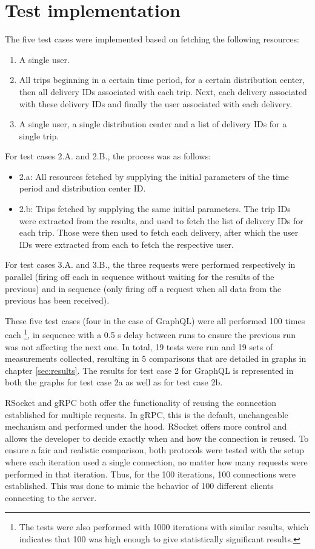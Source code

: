 \section{Test implementation}

The five test cases were implemented based on fetching the following resources:
\begin{enumerate}
    \item A single user.
    \item All trips beginning in a certain time period, for a certain distribution center, then all delivery IDs associated with each trip. Next, each delivery associated with these delivery IDs and finally the user associated with each delivery.
    \item A single user, a single distribution center and a list of delivery IDs for a single trip.
\end{enumerate}
For test cases 2.A. and 2.B., the process was as follows:
\begin{itemize}
    \item 2.a: All resources fetched by supplying the initial parameters of the time period and distribution center ID.
    \item 2.b: Trips fetched by supplying the same initial parameters. The trip IDs were extracted from the results, and used to fetch the list of delivery IDs for each trip. Those were then used to fetch each delivery, after which the user IDs were extracted from each to fetch the respective user.
\end{itemize}
For test cases 3.A. and 3.B., the three requests were performed respectively in parallel (firing off each in sequence without waiting for the results of the previous) and in sequence (only firing off a request when all data from the previous has been received).

These five test cases (four in the case of GraphQL) were all performed 100 times each \footnote{The tests were also performed with 1000 iterations with similar results, which indicates that 100 was high enough to give statistically significant results.}, in sequence with a 0.5 s delay between runs to ensure the previous run was not affecting the next one. In total, 19 tests were run and 19 sets of measurements collected, resulting in 5 comparisons that are detailed in graphs in chapter \ref{sec:results}. The results for test case 2 for GraphQL is represented in both the graphs for test case 2a as well as for test case 2b.

RSocket and gRPC both offer the functionality of reusing the connection established for multiple requests. In gRPC, this is the default, unchangeable mechanism and performed under the hood. RSocket offers more control and allows the developer to decide exactly when and how the connection is reused. To ensure a fair and realistic comparison, both protocols were tested with the setup where each iteration used a single connection, no matter how many requests were performed in that iteration. Thus, for the 100 iterations, 100 connections were established. This was done to mimic the behavior of 100 different clients connecting to the server.